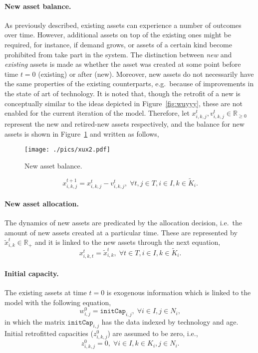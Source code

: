 \documentclass{amsart}
\begin{document}
\paragraph{New asset balance.}
As previously described, existing assets can experience a number of outcomes
over time. However, additional assets on top of the existing ones might be
required, for instance, if demand grows, or assets of a certain kind become
prohibited from take part in the system.  The distinction between \emph{new}
and \emph{existing} assets is made as whether the asset was created at some
point before time $t=0$ (existing) or after (new). Moreover, new assets do not
necessarily have the same properties of the existing counterparts, e.g.\ because
of improvements in the state of art of technology.  It is noted that, though the
retrofit of a new is conceptually similar to the ideas depicted in
Figure~\ref{fig:wuyyy}, these are not enabled for the current iteration of the
model.  Therefore, let $x^{t}_{i,k,j}, v^t_{i,k,j}\in \mathbb{R}_{\geq 0}$
represent the new and retired-new assets respectively, and the balance for new
assets is shown in Figure~\ref{fig:xux} and written as follows,
%
\begin{figure}[ht]
   \centering
   \texttt{[image: ./pics/xux2.pdf]} 
   \caption{New asset balance.} \label{fig:xux} 
\end{figure}
%
\begin{equation}
    x^{t+1}_{i,k,j} = x^{t}_{i,k,j} - v^t_{i,k,j} 
    ,\; \forall 
    t,j \in T, i \in I, k \in \tilde{K}_i.
\label{eq:xbal}
\end{equation}
%
\paragraph{New asset allocation.}
The dynamics of new assets are predicated by the allocation decision, i.e.\ the
amount of new assets created at a particular time. These are represented
by $\tilde{x}^t_{i,k}\in\mathbb{R}_+$ and it is linked to the new assets through
the next equation,
%
\begin{equation}
    x^t_{i,k,t} = \tilde{x}^t_{i,k}, \; 
    \forall t\in T, i\in I, k\in \tilde{K}_i.
    \label{eq:xeqxal}
\end{equation}
%
\paragraph{Initial capacity.}
%
The existing assets at time $t=0$ is exogenous information which is linked to
the model with the following equation, 
%
\begin{equation}
    w^0_{i,j} = \mathtt{initCap}_{i,j}, \; \forall i\in I, j\in N_i,
\end{equation}
%
in which the matrix $\mathtt{initCap}_{i,j}$ has the data indexed by technology
and age. Initial retrofitted capacities ($z^0_{i,k,j}$) are assumed to be zero,
i.e.,
%
\begin{equation}
    z^0_{i,k,j} = 0, \; \forall i\in I, k \in K_i, j\in N_i.
\end{equation}
%
%
\end{document}
